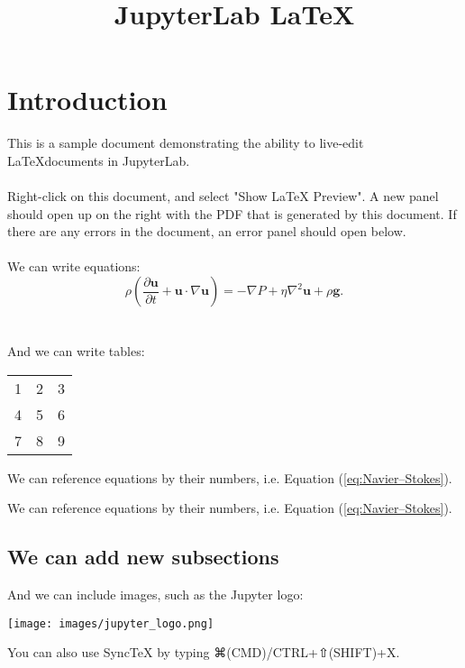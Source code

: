 \documentclass{article}
\begin{document}
\title{JupyterLab \LaTeX}
\date{}
\maketitle

\section{Introduction}
This is a sample document demonstrating the ability to live-edit
\LaTeX documents in JupyterLab.
\\
\\
Right-click on this document, and select "Show LaTeX Preview".
A new panel should open up on the right with the PDF that is generated
by this document. If there are any errors in the document, an
error panel should open below.
\\
\\
We can write equations:
\begin{equation}
    \rho \left( \frac{\partial \mathbf{u}}{\partial t} + \mathbf{u} \cdot \nabla \mathbf{u} \right) =
    -\nabla P + \eta \nabla^2 \mathbf{u} + \rho \mathbf{g}.
\label{eq:Navier–Stokes}
\end{equation}
\\
\\
And we can write tables:
\begin{center}
  \begin{tabular}{ | l | c | r| }
    \hline
    1 & 2 & 3 \\ 
    4 & 5 & 6 \\ 
    7 & 8 & 9 \\
    \hline
  \end{tabular}
\end{center}




We can reference equations by their numbers, i.e. Equation (\ref{eq:Navier–Stokes}).


We can reference equations by their numbers, i.e. Equation (\ref{eq:Navier–Stokes}).


\subsection{We can add new subsections}
And we can include images, such as the Jupyter logo:
\begin{center}
  \texttt{[image: images/jupyter\_logo.png]}
\end{center}



\pagebreak


You can also use SyncTeX by typing ⌘(CMD)/CTRL+⇧(SHIFT)+X.
\end{document}
